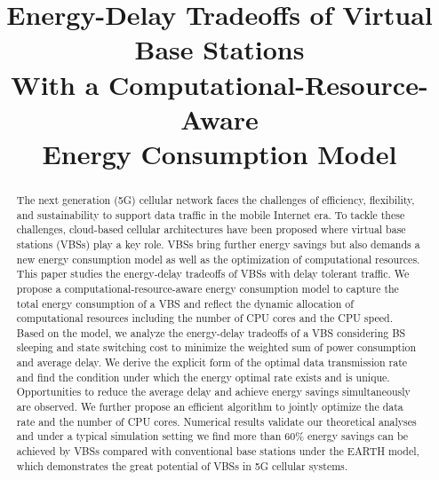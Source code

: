 \documentclass[conference]{IEEEtran}
\begin{document}
\title{Energy-Delay Tradeoffs of Virtual Base Stations\\
With a Computational-Resource-Aware\\
Energy Consumption Model}
\author{
}
\maketitle

\begin{abstract}

  The next generation (5G) cellular network faces the challenges of efficiency,
  flexibility, and sustainability to support data traffic in the mobile
  Internet era.  To tackle these challenges, cloud-based cellular architectures
  have been proposed where virtual base stations (VBSs) play a key role.
  VBSs bring further energy savings but also demands a new energy
  consumption model as well as the optimization of computational resources.
  This paper studies the energy-delay tradeoffs of VBSs with delay
  tolerant traffic. We propose a computational-resource-aware
  energy consumption model to capture the total energy consumption of a VBS
  and reflect the dynamic allocation of computational resources including the
  number of CPU cores and the CPU speed.
  Based on the model, we analyze the energy-delay tradeoffs of a VBS considering
  BS sleeping and state switching cost to minimize the weighted sum of
  power consumption and average delay.
  We derive the explicit form of the
  optimal data transmission rate and find the condition under which the energy
  optimal rate exists and is unique. Opportunities to
  reduce the
  average delay and achieve energy savings simultaneously are observed. We further
  propose an efficient
  algorithm to jointly optimize the data rate and the number of CPU cores. Numerical
  results validate our theoretical analyses and under a typical simulation
  setting we find more than 60\% energy savings can be achieved by VBSs
  compared with
  conventional base stations under the EARTH model, which demonstrates the great potential of VBSs in 5G
  cellular systems.

\end{abstract}
\end{document}
